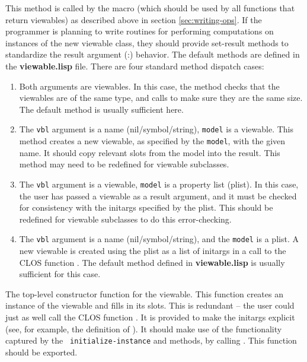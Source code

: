 \begin{description}
\item{}
This method is called by the  macro (which should be
used by all functions that return viewables) as described above in
section \ref{sec:writing-ops}.  If the programmer is planning to write
routines for performing computations on instances of the new viewable
class, they should provide set-result methods to standardize the
result argument (:\res) behavior. The default methods are defined in
the {\bf viewable.lisp} file. There are four standard method dispatch
cases:
\begin{enumerate}
\item Both arguments are viewables.  In this case, the method checks that 
the viewables are of the same type, and calls  to
make sure they are the same size.  The default method is usually
sufficient here.
\item The {\tt vbl} argument is a name (nil/symbol/string), {\tt model} is a viewable.  
This method creates a new viewable, as specified by the {\tt model},
with the given name.  It should copy relevant slots from the model
into the result.  This method may need to be redefined for viewable
subclasses.
\item The {\tt vbl} argument is a viewable, {\tt model} is a property list (plist).  In
this case, the user has passed a viewable as a result argument, and it
must be checked for consistency with the initargs specified by the
plist.  This should be redefined for viewable subclasses to do this
error-checking.
\item The {\tt vbl} argument is a name (nil/symbol/string), and the
{\tt model} is a plist.  A new viewable is created using the plist as
a list of initargs in a call to the CLOS function
.  The default method defined in {\bf
viewable.lisp} is usually sufficient for this case.
\end{enumerate}

\item{}
The top-level constructor function for the viewable.  This function
creates an instance of the viewable and fills in its slots.  This is
redundant -- the user could just as well call the CLOS function
.  It is provided to make the initargs explicit
(see, for example, the definition of ).  It should
make use of the functionality captured by the {\tt
initialize-instance} and  methods, by calling
.  This function should
be exported.


\end{description}
